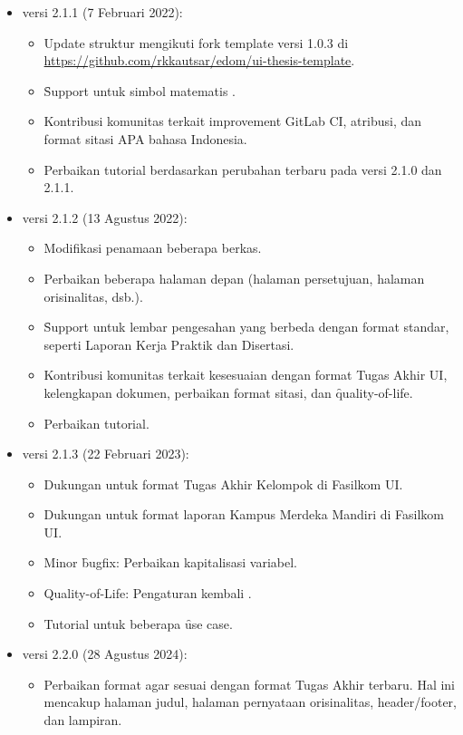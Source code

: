 \begin{itemize}
	\item versi 2.1.1 (7 Februari 2022):
		\begin{itemize}
			\item Update struktur mengikuti fork template versi 1.0.3 di \url{https://github.com/rkkautsar/edom/ui-thesis-template}.
			\item \f{Support} untuk simbol matematis .
			\item Kontribusi komunitas terkait improvement GitLab CI, atribusi, dan format sitasi APA bahasa Indonesia.
			\item Perbaikan tutorial berdasarkan perubahan terbaru pada versi 2.1.0 dan 2.1.1.
		\end{itemize}
	\item versi 2.1.2 (13 Agustus 2022):
		\begin{itemize}
			\item Modifikasi penamaan beberapa berkas.
			\item Perbaikan beberapa halaman depan (halaman persetujuan, halaman orisinalitas, dsb.).
			\item \f{Support} untuk lembar pengesahan yang berbeda dengan format standar, seperti Laporan Kerja Praktik dan Disertasi.
			\item Kontribusi komunitas terkait kesesuaian dengan format Tugas Akhir UI, kelengkapan dokumen, perbaikan format sitasi, dan \f{quality-of-life}.
			\item Perbaikan tutorial.
		\end{itemize}
	\item versi 2.1.3 (22 Februari 2023):
		\begin{itemize}
			\item Dukungan untuk format Tugas Akhir Kelompok di Fasilkom UI.
			\item Dukungan untuk format laporan Kampus Merdeka Mandiri di Fasilkom UI.
			\item Minor \f{bugfix}: Perbaikan kapitalisasi variabel.
			\item Quality-of-Life: Pengaturan kembali .
			\item Tutorial untuk beberapa \f{use case}.
		\end{itemize}
	\item versi 2.2.0 (28 Agustus 2024):
		\begin{itemize}
			\item Perbaikan format agar sesuai dengan format Tugas Akhir terbaru. Hal ini mencakup halaman judul, halaman pernyataan orisinalitas, header/footer, dan lampiran.

\end{itemize}
\end{itemize}
